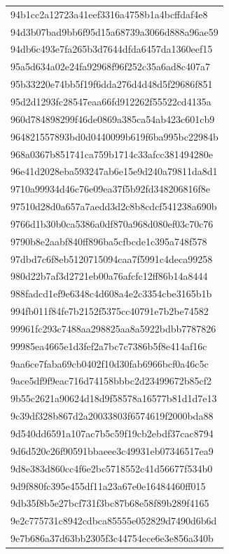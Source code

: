 \begin{tabular}{l}
94b1cc2a12723a41eef3316a4758b1a4bcffdaf4e8 \\
94d3b07bad9bb6f95d15a68739a3066d888a96ae59 \\
94db6c493e7fa265b3d7644dfda6457da1360eef15 \\
95a5d634a02e24fa92968f96f252c35a6ad8c407a7 \\
95b33220e74bb5f19f6dda276d4d48d5f29686f851 \\
95d2d1293fc28547eaa66fd912262f55522cd4135a \\
960d784898299f46de0869a385ca54ab423c601cb9 \\
964821557893bd0d0440099b619f6ba995bc22984b \\
968a0367b851741ca759b1714c33afcc381494280e \\
96e41d2028eba593247ab6e15e9d240a79811da8d1 \\
9710a99934d46c76e09ea37f5b92fd348206816f8e \\
97510d28d0a657a7aedd3d2c8b8cdcf541238a690b \\
9766d1b30b0ca5386a0df870a968d080ef03c70c76 \\
9790b8e2aabf840ff896ba5cfbcde1c395a748f578 \\
97dbd7c6f8eb5120715094caa7f5991c4deca99258 \\
980d22b7af3d2721eb00a76afcfc12ff86b14a8444 \\
988fadcd1ef9e6348c4d608a4e2c3354cbe3165b1b \\
994fb011f84fe7b2152f5375cc40791e7b2be74582 \\
99961fc293c7488aa298825aa8a5922bdbb7787826 \\
99985ea4665e1d3fef2a7bc7c7386b5f8e414af16c \\
9aa6ce7faba69cb0402f10d30fab6966bcf0a46c5c \\
9ace5df9f9eac716d74158bbbc2d23499672b85cf2 \\
9b55c2621a90624d18d9f58578a16577b81d1d7e13 \\
9c39df328b867d2a20033803f6574619f2000bda88 \\
9d540dd6591a107ac7b5c59f19cb2ebdf37cac8794 \\
9d6d520c26f90591bbaeee3c49931eb07346517ea9 \\
9d8e383d860cc4f6e2bc5718552c41d56677f534b0 \\
9d9f880fc395e455df11a23a67e0e16484460ff015 \\
9db35f8b5e27bcf731f3bc87b68e58f89b289f4165 \\
9e2c775731c8942cdbca85555e052829d7490d6b6d \\
9e7b686a37d63bb2305f3c44754ece6e3e856a340b \\

\end{tabular}
